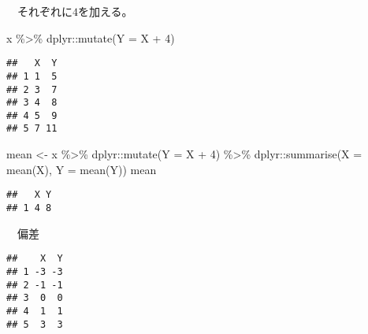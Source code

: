 \documentclass[
  12pt,
]{book}
\newenvironment{Shaded}{\begin{snugshade}}{\end{snugshade}}
\newcommand{\AttributeTok}[1]{\textcolor[rgb]{0.77,0.63,0.00}{#1}}
\newcommand{\DecValTok}[1]{\textcolor[rgb]{0.00,0.00,0.81}{#1}}
\newcommand{\FunctionTok}[1]{\textcolor[rgb]{0.00,0.00,0.00}{#1}}
\newcommand{\NormalTok}[1]{#1}
\newcommand{\OtherTok}[1]{\textcolor[rgb]{0.56,0.35,0.01}{#1}}
\newcommand{\SpecialCharTok}[1]{\textcolor[rgb]{0.00,0.00,0.00}{#1}}
\begin{document}
　それぞれに\(4\)を加える。

\begin{Shaded}
\begin{Highlighting}[]
\NormalTok{x }\SpecialCharTok{\%\textgreater{}\%} 
\NormalTok{  dplyr}\SpecialCharTok{::}\FunctionTok{mutate}\NormalTok{(}\AttributeTok{Y =}\NormalTok{ X }\SpecialCharTok{+} \DecValTok{4}\NormalTok{)}
\end{Highlighting}
\end{Shaded}

\begin{verbatim}
##   X  Y
## 1 1  5
## 2 3  7
## 3 4  8
## 4 5  9
## 5 7 11
\end{verbatim}

\begin{Shaded}
\begin{Highlighting}[]
\NormalTok{mean }\OtherTok{\textless{}{-}}\NormalTok{ x }\SpecialCharTok{\%\textgreater{}\%} 
\NormalTok{  dplyr}\SpecialCharTok{::}\FunctionTok{mutate}\NormalTok{(}\AttributeTok{Y =}\NormalTok{ X }\SpecialCharTok{+} \DecValTok{4}\NormalTok{) }\SpecialCharTok{\%\textgreater{}\%} 
\NormalTok{  dplyr}\SpecialCharTok{::}\FunctionTok{summarise}\NormalTok{(}\AttributeTok{X =} \FunctionTok{mean}\NormalTok{(X), }\AttributeTok{Y =} \FunctionTok{mean}\NormalTok{(Y))}
\NormalTok{mean}
\end{Highlighting}
\end{Shaded}

\begin{verbatim}
##   X Y
## 1 4 8
\end{verbatim}

　偏差

\begin{Shaded}
\end{Shaded}

\begin{verbatim}
##    X  Y
## 1 -3 -3
## 2 -1 -1
## 3  0  0
## 4  1  1
## 5  3  3
\end{verbatim}
\end{document}
